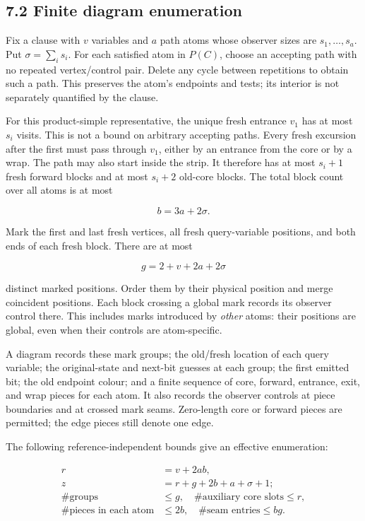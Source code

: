 \documentclass[
  11pt,
  a4paper,
]{article}
\begin{document}
\subsection{7.2 Finite diagram
enumeration}\label{finite-diagram-enumeration}

Fix a clause with \(v\) variables and \(a\) path atoms whose observer
sizes are \(s_1,\ldots,s_a\). Put \(\sigma=\sum_i s_i\). For each
satisfied atom in \(P(C)\), choose an accepting path with no repeated
vertex/control pair. Delete any cycle between repetitions to obtain such
a path. This preserves the atom's endpoints and tests; its interior is
not separately quantified by the clause.

For this product-simple representative, the unique fresh entrance
\(v_1\) has at most \(s_i\) visits. This is not a bound on arbitrary
accepting paths. Every fresh excursion after the first must pass through
\(v_1\), either by an entrance from the core or by a wrap. The path may
also start inside the strip. It therefore has at most \(s_i+1\) fresh
forward blocks and at most \(s_i+2\) old-core blocks. The total block
count over all atoms is at most

\[b=3a+2\sigma.\tag{7.2}\]

Mark the first and last fresh vertices, all fresh query-variable
positions, and both ends of each fresh block. There are at most

\[g=2+v+2a+2\sigma\tag{7.3}\]

distinct marked positions. Order them by their physical position and
merge coincident positions. Each block crossing a global mark records
its observer control there. This includes marks introduced by
\emph{other} atoms: their positions are global, even when their controls
are atom-specific.

A diagram records these mark groups; the old/fresh location of each
query variable; the original-state and next-bit guesses at each group;
the first emitted bit; the old endpoint colour; and a finite sequence of
core, forward, entrance, exit, and wrap pieces for each atom. It also
records the observer controls at piece boundaries and at crossed mark
seams. Zero-length core or forward pieces are permitted; the edge pieces
still denote one edge.

The following reference-independent bounds give an effective
enumeration:

\[
\begin{aligned}
r&=v+2ab,\\
z&=r+g+2b+a+\sigma+1;\\
\#\text{groups}&\le g,\quad \#\text{auxiliary core slots}\le r,\\
\#\text{pieces in each atom}&\le2b,\quad
\#\text{seam entries}\le bg.
\end{aligned}\tag{7.4}\]
\end{document}
